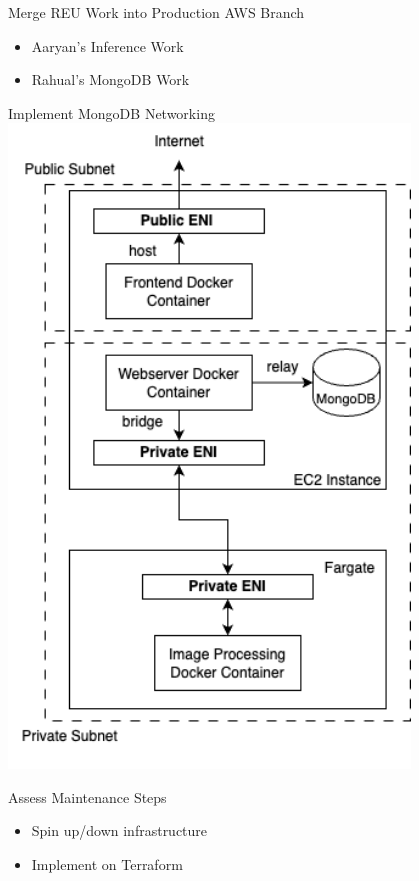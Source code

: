 \begin{frame}{Merge REU Work into Production AWS Branch}
    \begin{itemize}
        \item Aaryan's Inference Work
        \item Rahual's MongoDB Work
    \end{itemize}   
\end{frame}

\begin{frame}{Implement MongoDB Networking}
    \centering
    \includegraphics[height=0.8\textheight,width=0.8\textwidth,keepaspectratio]{images/mm_networking.png}
\end{frame}

\begin{frame}{Assess Maintenance Steps}
    \begin{itemize}
        \item Spin up/down infrastructure
        \item Implement on Terraform
    \end{itemize}  
\end{frame}

